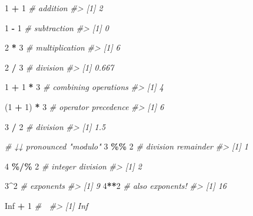 \documentclass[
]{report}
\newenvironment{Shaded}{\begin{snugshade}}{\end{snugshade}}
\newcommand{\CommentTok}[1]{\textcolor[rgb]{0.56,0.35,0.01}{\textit{#1}}}
\newcommand{\DecValTok}[1]{\textcolor[rgb]{0.00,0.00,0.81}{#1}}
\newcommand{\NormalTok}[1]{#1}
\newcommand{\OperatorTok}[1]{\textcolor[rgb]{0.81,0.36,0.00}{\textbf{#1}}}
\newcommand{\OtherTok}[1]{\textcolor[rgb]{0.56,0.35,0.01}{#1}}
\newcommand{\StringTok}[1]{\textcolor[rgb]{0.31,0.60,0.02}{#1}}
\begin{document}
\begin{Shaded}
\begin{Highlighting}[]
\DecValTok{1} \OperatorTok{+}\StringTok{ }\DecValTok{1}                     \CommentTok{\# addition}
\CommentTok{\#\textgreater{} [1] 2}

\DecValTok{1} \OperatorTok{{-}}\StringTok{ }\DecValTok{1}                     \CommentTok{\# subtraction}
\CommentTok{\#\textgreater{} [1] 0}

\DecValTok{2} \OperatorTok{*}\StringTok{ }\DecValTok{3}                     \CommentTok{\# multiplication}
\CommentTok{\#\textgreater{} [1] 6}

\DecValTok{2} \OperatorTok{/}\StringTok{ }\DecValTok{3}                     \CommentTok{\# division}
\CommentTok{\#\textgreater{} [1] 0.667}

\DecValTok{1} \OperatorTok{+}\StringTok{ }\DecValTok{1} \OperatorTok{*}\StringTok{ }\DecValTok{3}                 \CommentTok{\# combining operations}
\CommentTok{\#\textgreater{} [1] 4}

\NormalTok{(}\DecValTok{1} \OperatorTok{+}\StringTok{ }\DecValTok{1}\NormalTok{) }\OperatorTok{*}\StringTok{ }\DecValTok{3}               \CommentTok{\# operator precedence}
\CommentTok{\#\textgreater{} [1] 6}

\DecValTok{3} \OperatorTok{/}\StringTok{ }\DecValTok{2}                     \CommentTok{\# division}
\CommentTok{\#\textgreater{} [1] 1.5}

\CommentTok{\# ↓↓ pronounced "modulo"}
\DecValTok{3} \OperatorTok{\%\%}\StringTok{ }\DecValTok{2}                    \CommentTok{\# division remainder}
\CommentTok{\#\textgreater{} [1] 1}

\DecValTok{4} \OperatorTok{\%/\%}\StringTok{ }\DecValTok{2}                   \CommentTok{\# integer division}
\CommentTok{\#\textgreater{} [1] 2}

\DecValTok{3}\OperatorTok{\^{}}\DecValTok{2}                       \CommentTok{\# exponents}
\CommentTok{\#\textgreater{} [1] 9}
\DecValTok{4}\OperatorTok{**}\DecValTok{2}                      \CommentTok{\# also exponents!}
\CommentTok{\#\textgreater{} [1] 16}

\OtherTok{Inf} \OperatorTok{+}\StringTok{ }\DecValTok{1}       \CommentTok{\# 🤔}
\CommentTok{\#\textgreater{} [1] Inf}
\end{Highlighting}
\end{Shaded}
\end{document}
